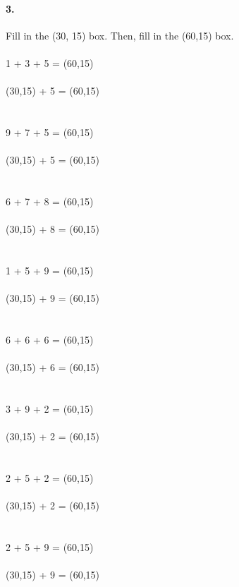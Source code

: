 \documentclass[12pt]{article}
\begin{document}
\paragraph{3.}
Fill in the \framebox(30, 15){} box. Then, fill in the \framebox(60,15){} box.\\
\\
1 + 3 + 5 = \framebox(60,15){}
\\
\\
\framebox(30,15){} + 5 = \framebox(60,15){}
\\
\\
\\
9 + 7 + 5 = \framebox(60,15){}
\\
\\
\framebox(30,15){} + 5 = \framebox(60,15){}
\\
\\
\\
6 + 7 + 8 = \framebox(60,15){}
\\
\\
\framebox(30,15){} + 8 = \framebox(60,15){}
\\
\\
\\
1 + 5 + 9 = \framebox(60,15){}
\\
\\
\framebox(30,15){} + 9 = \framebox(60,15){}
\\
\\
\\
6 + 6 + 6 = \framebox(60,15){}
\\
\\
\framebox(30,15){} + 6 = \framebox(60,15){}
\\
\\
\\
3 + 9 + 2 = \framebox(60,15){}
\\
\\
\framebox(30,15){} + 2 = \framebox(60,15){}
\\
\\
\\
2 + 5 + 2 = \framebox(60,15){}
\\
\\
\framebox(30,15){} + 2 = \framebox(60,15){}
\\
\\
\\
2 + 5 + 9 = \framebox(60,15){}
\\
\\
\framebox(30,15){} + 9 = \framebox(60,15){}
\\
\\
\end{document}
